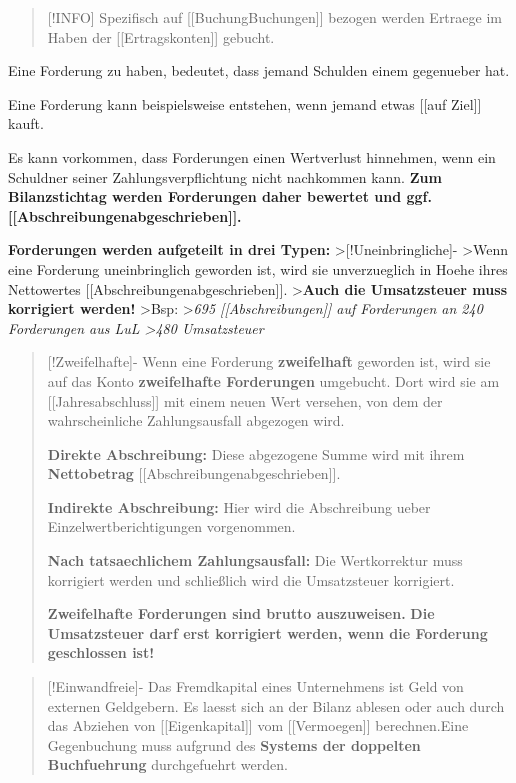 \begin{quote}
{[}!INFO{]} Spezifisch auf {[}{[}Buchung\textbar Buchungen{]}{]} bezogen
werden Ertraege im Haben der {[}{[}Ertragskonten{]}{]} gebucht.
\end{quote}

Eine Forderung zu haben, bedeutet, dass jemand Schulden einem gegenueber
hat.

Eine Forderung kann beispielsweise entstehen, wenn jemand etwas
{[}{[}auf Ziel{]}{]} kauft.

Es kann vorkommen, dass Forderungen einen Wertverlust hinnehmen, wenn
ein Schuldner seiner Zahlungsverpflichtung nicht nachkommen kann.
\textbf{Zum Bilanzstichtag werden Forderungen daher bewertet und ggf.
{[}{[}Abschreibungen\textbar abgeschrieben{]}{]}.}

\textbf{Forderungen werden aufgeteilt in drei Typen:}
\textgreater{[}!Uneinbringliche{]}- \textgreater Wenn eine Forderung
uneinbringlich geworden ist, wird sie unverzueglich in Hoehe ihres
Nettowertes {[}{[}Abschreibungen\textbar abgeschrieben{]}{]}.
\textgreater{}\textbf{Auch die Umsatzsteuer muss korrigiert werden!}
\textgreater Bsp: \textgreater{}\emph{695 {[}{[}Abschreibungen{]}{]} auf
Forderungen an 240 Forderungen aus LuL \textgreater480 Umsatzsteuer}

\begin{quote}
{[}!Zweifelhafte{]}- Wenn eine Forderung \textbf{zweifelhaft} geworden
ist, wird sie auf das Konto \textbf{zweifelhafte Forderungen} umgebucht.
Dort wird sie am {[}{[}Jahresabschluss{]}{]} mit einem neuen Wert
versehen, von dem der wahrscheinliche Zahlungsausfall abgezogen wird.

\textbf{Direkte Abschreibung:} Diese abgezogene Summe wird mit ihrem
\textbf{Nettobetrag} {[}{[}Abschreibungen\textbar abgeschrieben{]}{]}.

\textbf{Indirekte Abschreibung:} Hier wird die Abschreibung ueber
Einzelwertberichtigungen vorgenommen.

\textbf{Nach tatsaechlichem Zahlungsausfall:} Die Wertkorrektur muss
korrigiert werden und schließlich wird die Umsatzsteuer korrigiert.

\textbf{Zweifelhafte Forderungen sind brutto auszuweisen.} \textbf{Die
Umsatzsteuer darf erst korrigiert werden, wenn die Forderung geschlossen
ist!}
\end{quote}

\begin{quote}
{[}!Einwandfreie{]}- Das Fremdkapital eines Unternehmens ist Geld von
externen Geldgebern. Es laesst sich an der Bilanz ablesen oder auch durch
das Abziehen von {[}{[}Eigenkapital{]}{]} vom {[}{[}Vermoegen{]}{]}
berechnen.Eine Gegenbuchung muss aufgrund des \textbf{Systems der
doppelten Buchfuehrung} durchgefuehrt werden.
\end{quote}

